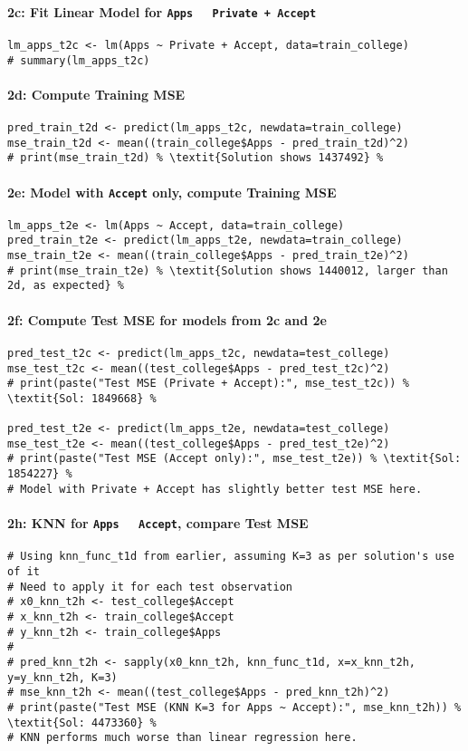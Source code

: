 \documentclass[12pt,a4paper]{article}
\newcommand{\Rcode}[1]{\texttt{#1}} %
\begin{document}
            \paragraph{2c: Fit Linear Model for \Rcode{Apps ~ Private + Accept}}
\begin{lstlisting}
lm_apps_t2c <- lm(Apps ~ Private + Accept, data=train_college)
# summary(lm_apps_t2c)
\end{lstlisting}
            \paragraph{2d: Compute Training MSE}
\begin{lstlisting}
pred_train_t2d <- predict(lm_apps_t2c, newdata=train_college)
mse_train_t2d <- mean((train_college$Apps - pred_train_t2d)^2)
# print(mse_train_t2d) % \textit{Solution shows 1437492} %
\end{lstlisting}
            \paragraph{2e: Model with \Rcode{Accept} only, compute Training MSE}
\begin{lstlisting}
lm_apps_t2e <- lm(Apps ~ Accept, data=train_college)
pred_train_t2e <- predict(lm_apps_t2e, newdata=train_college)
mse_train_t2e <- mean((train_college$Apps - pred_train_t2e)^2)
# print(mse_train_t2e) % \textit{Solution shows 1440012, larger than 2d, as expected} %
\end{lstlisting}
            \paragraph{2f: Compute Test MSE for models from 2c and 2e}
\begin{lstlisting}
pred_test_t2c <- predict(lm_apps_t2c, newdata=test_college)
mse_test_t2c <- mean((test_college$Apps - pred_test_t2c)^2)
# print(paste("Test MSE (Private + Accept):", mse_test_t2c)) % \textit{Sol: 1849668} %

pred_test_t2e <- predict(lm_apps_t2e, newdata=test_college)
mse_test_t2e <- mean((test_college$Apps - pred_test_t2e)^2)
# print(paste("Test MSE (Accept only):", mse_test_t2e)) % \textit{Sol: 1854227} %
# Model with Private + Accept has slightly better test MSE here.
\end{lstlisting}
            \paragraph{2h: KNN for \Rcode{Apps ~ Accept}, compare Test MSE}
\begin{lstlisting}
# Using knn_func_t1d from earlier, assuming K=3 as per solution's use of it
# Need to apply it for each test observation
# x0_knn_t2h <- test_college$Accept
# x_knn_t2h <- train_college$Accept
# y_knn_t2h <- train_college$Apps
# 
# pred_knn_t2h <- sapply(x0_knn_t2h, knn_func_t1d, x=x_knn_t2h, y=y_knn_t2h, K=3)
# mse_knn_t2h <- mean((test_college$Apps - pred_knn_t2h)^2)
# print(paste("Test MSE (KNN K=3 for Apps ~ Accept):", mse_knn_t2h)) % \textit{Sol: 4473360} %
# KNN performs much worse than linear regression here.
\end{lstlisting}
\end{document}
